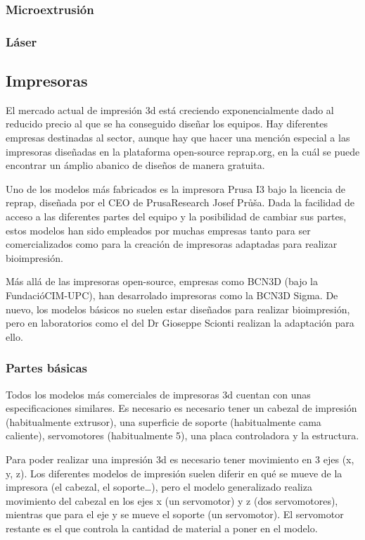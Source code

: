 \documentclass[a4paper,12pt]{article}
\begin{document}
\subsubsection{Microextrusión}

\subsubsection{Láser}

\subsection{Impresoras}
El mercado actual de impresión 3d está creciendo exponencialmente dado al reducido precio al que se ha conseguido diseñar los equipos. Hay diferentes empresas destinadas al sector, aunque hay que hacer una mención especial a las impresoras diseñadas en la plataforma open-source reprap.org, en la cuál se puede encontrar un ámplio abanico de diseños de manera gratuita.

Uno de los modelos más fabricados es la impresora Prusa I3 bajo la licencia de reprap, diseñada por el CEO de PrusaResearch Josef Průša. Dada la facilidad de acceso a las diferentes partes del equipo y la posibilidad de cambiar sus partes, estos modelos han sido empleados por muchas empresas tanto para ser comercializados como para la creación de impresoras adaptadas para realizar bioimpresión.

Más allá de las impresoras open-source, empresas como BCN3D (bajo la FundacióCIM-UPC), han desarrolado impresoras como la BCN3D Sigma. De nuevo, los modelos básicos no suelen estar diseñados para realizar bioimpresión, pero en laboratorios como el del Dr Gioseppe Scionti realizan la adaptación para ello.

\subsubsection{Partes básicas}
Todos los modelos más comerciales de impresoras 3d cuentan con unas especificaciones similares. Es necesario es necesario tener un cabezal de impresión (habitualmente extrusor), una superficie de soporte (habitualmente cama caliente), servomotores (habitualmente 5), una placa controladora y la estructura.

Para poder realizar una impresión 3d es necesario tener movimiento en 3 ejes (x, y, z). Los diferentes modelos de impresión suelen diferir en qué se mueve de la impresora (el cabezal, el soporte…), pero el modelo generalizado realiza movimiento del cabezal en los ejes x (un servomotor) y z (dos servomotores), mientras que para el eje y se mueve el soporte (un servomotor). El servomotor restante es el que controla la cantidad de material a poner en el modelo.
\end{document}
